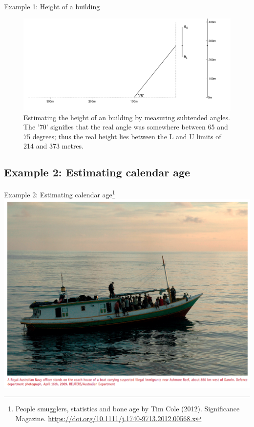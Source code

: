 \documentclass[10pt,handout]{beamer}\usepackage[]{graphicx}\usepackage[]{color}
\makeatletter
\def\maxwidth{ %
  \ifdim\Gin@nat@width>\linewidth
    \linewidth
  \else
    \Gin@nat@width
  \fi
}
\newenvironment{knitrout}{}{} %
\makeatother
\begin{document}
\begin{frame}[fragile]{Example 1: Height of a building}

\begin{knitrout}\tiny
{}\color{fgcolor}\begin{figure}

{\centering \includegraphics[width=\maxwidth]{figure/hanley-fig2-1} 

}

\caption[Estimating the height of an building by measuring subtended angles]{Estimating the height of an building by measuring subtended angles. The '70' signifies that the real angle was somewhere between 65 and 75 degrees; thus the real height lies between the L and U limits of 214 and 373 metres.}\label{fig:hanley-fig2}
\end{figure}

\end{knitrout}


\end{frame}

\subsection{Example 2: Estimating calendar age}

\begin{frame}{Example 2: Estimating calendar age\footnote{\tiny{People smugglers, statistics and bone age by Tim Cole (2012). Significance Magazine. \url{https://doi.org/10.1111/j.1740-9713.2012.00568.x}}}}
	\centering
\includegraphics[scale=0.35]{boat.png}
\end{frame}
\end{document}
